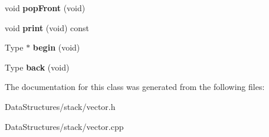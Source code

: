 \begin{DoxyCompactItemize}
\mbox{\label{classMyVector_a38fd78190795c1d26ce5afee7aabcdaa}} 
void {\bfseries pop\+Front} (void)
\item 
\mbox{\label{classMyVector_ad7cc75f5ba4df27bd20a9b6844dcb10e}} 
void {\bfseries print} (void) const
\item 
\mbox{\label{classMyVector_a0646f68d29b585e684e2a6c539c87854}} 
Type $\ast$ {\bfseries begin} (void)
\item 
\mbox{\label{classMyVector_a903e3c1b014989ed316cc5b39f130bdf}} 
Type {\bfseries back} (void)
\end{DoxyCompactItemize}


The documentation for this class was generated from the following files\+:\begin{DoxyCompactItemize}
\item 
Data\+Structures/stack/vector.\+h\item 
Data\+Structures/stack/vector.\+cpp\end{DoxyCompactItemize}
